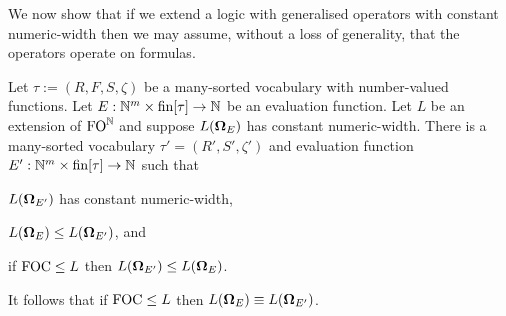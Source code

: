\documentclass[../main/thesis.tex]{subfiles}
\begin{document}
We now show that if we extend a logic with generalised operators with constant
numeric-width then we may assume, without a loss of generality, that the
operators operate on formulas.

\begin{prop}
  Let $\tau := (R, F, S, \zeta)$ be a many-sorted vocabulary with number-valued
  functions. Let $E : \mathbb{N}^m \times \text{\upshape fin}[\tau] \rightarrow \mathbb{N}$ be an evaluation
  function. Let $L$ be an extension of $\text{\upshape FO}^{\mathbb{N}}$ and suppose $L(\mathbf{\mathbf{\Omega}}_E)$
  has constant numeric-width. There is a many-sorted vocabulary $\tau' = (R',
  S', \zeta')$ and evaluation function $E' : \mathbb{N}^m \times \text{\upshape fin}[\tau] \rightarrow
  \mathbb{N}$ such that
  \begin{myenum}
  \item \label{obj:const-width}$L(\mathbf{\mathbf{\Omega}}_{E'})$ has constant numeric-width,
  \item \label{obj:left-right} $L(\mathbf{\mathbf{\Omega}}_{E}) \leq L(\mathbf{\mathbf{\Omega}}_{E'})$, and
  \item \label{obj:FOC-right-left} if $\text{\upshape FOC} \leq L$ then $L(\mathbf{\mathbf{\Omega}}_{E'}) \leq
    L(\mathbf{\mathbf{\Omega}}_{E})$.
  \end{myenum}
  It follows that if $\text{\upshape FOC} \leq L$ then $L(\mathbf{\mathbf{\Omega}}_{E}) \equiv L(\mathbf{\mathbf{\Omega}}_{E'})$.
  \label{prop:op-to-op-on-formulas}
\end{prop}
\end{document}
